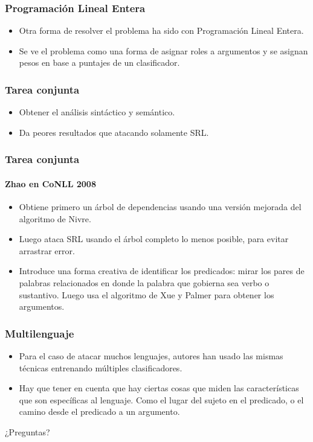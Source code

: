 \documentclass{beamer}
\begin{document}
\begin{frame}
  \frametitle{Programación Lineal Entera}

  \begin{itemize}
    \item Otra forma de resolver el problema ha sido con Programación Lineal Entera.

    \item Se ve el problema como una forma de asignar roles a argumentos y se asignan pesos en base a puntajes de un clasificador.
  \end{itemize}
\end{frame}

\begin{frame}
  \frametitle{Tarea conjunta}

  \begin{itemize}
    \item Obtener el análisis sintáctico y semántico.

    \item Da peores resultados que atacando solamente SRL\@.
  \end{itemize}
\end{frame}

\begin{frame}
  \frametitle{Tarea conjunta}
  \framesubtitle{Zhao en CoNLL 2008}

  \begin{itemize}
    \item Obtiene primero un árbol de dependencias usando una versión mejorada del algoritmo de Nivre.

    \item Luego ataca SRL usando el árbol completo lo menos posible, para evitar arrastrar error.

    \item Introduce una forma creativa de identificar los predicados: mirar los pares de palabras relacionados en donde la palabra que gobierna sea verbo o sustantivo. Luego usa el algoritmo de Xue y Palmer para obtener los argumentos.
  \end{itemize}
\end{frame}

\begin{frame}
  \frametitle{Multilenguaje}

  \begin{itemize}
    \item Para el caso de atacar muchos lenguajes, autores han usado las mismas técnicas entrenando múltiples clasificadores.

    \item Hay que tener en cuenta que hay ciertas cosas que miden las características que son específicas al lenguaje. Como el lugar del sujeto en el predicado, o el camino desde el predicado a un argumento.
  \end{itemize}
\end{frame}

\begin{frame}
    \Huge{\centerline{¿Preguntas?}}
\end{frame}
\end{document}
